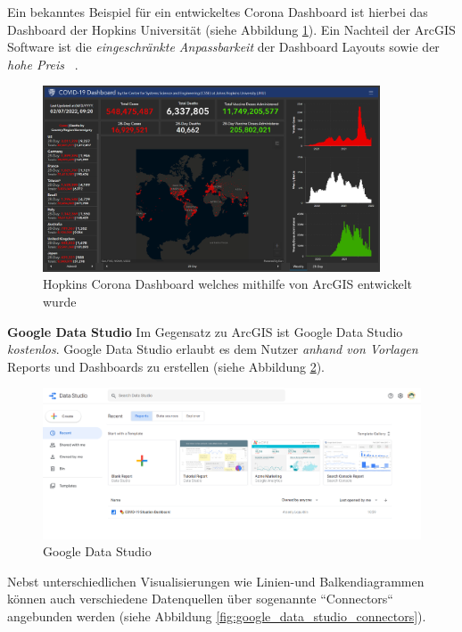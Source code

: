 Ein bekanntes Beispiel für ein entwickeltes Corona Dashboard ist hierbei das Dashboard der Hopkins Universität (siehe Abbildung \ref{fig:arcgis_hopkins_dashboard}). Ein Nachteil der ArcGIS Software ist die \textit{eingeschränkte Anpassbarkeit} der Dashboard Layouts sowie der \textit{hohe Preis} ~\citep{arcgis_comparison}.


\begin{figure}[h]
    \includegraphics[width=10cm]{images/arcgis_hopkins_dashboard.png}
    \centering
    \caption{Hopkins Corona Dashboard welches mithilfe von ArcGIS entwickelt wurde ~\citep{arcgis_hopkins_dashboard}}
    \label{fig:arcgis_hopkins_dashboard}
\end{figure}


\clearpage
\noindent
\textbf{Google Data Studio}
\newline
\indent
Im Gegensatz zu ArcGIS ist Google Data Studio \textit{kostenlos}. Google Data Studio erlaubt es dem Nutzer \textit{anhand von Vorlagen} Reports und Dashboards zu erstellen (siehe Abbildung \ref{fig:google_data_studio}).

\begin{figure}[h]
    \includegraphics[width=12cm]{images/google_data_studio.png}
    \centering
    \caption{Google Data Studio ~\citep{google_data_studio}}
    \label{fig:google_data_studio}
\end{figure}

Nebst unterschiedlichen Visualisierungen wie Linien-und Balkendiagrammen können auch verschiedene Datenquellen über sogenannte ``Connectors`` angebunden werden (siehe Abbildung \ref{fig:google_data_studio_connectors}).


